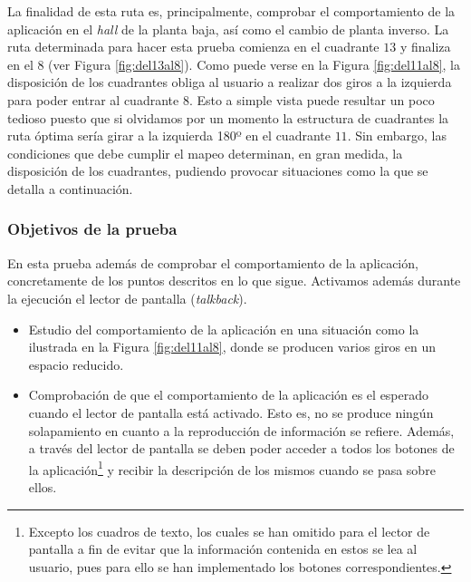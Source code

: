 La finalidad de esta ruta es, principalmente, comprobar el comportamiento de la aplicación en el \textit{hall} de la planta baja, así como el cambio de planta inverso. La ruta determinada para hacer esta prueba comienza en el cuadrante $13$ y finaliza en el $8$ (ver Figura \ref{fig:del13al8}). Como puede verse en la Figura \ref{fig:del11al8}, la disposición de los cuadrantes obliga al usuario a realizar dos giros a la izquierda para poder entrar al cuadrante $8$. Esto a simple vista puede resultar un poco tedioso puesto que si olvidamos por un momento la estructura de cuadrantes la ruta óptima sería girar a la izquierda 180º en el cuadrante $11$. Sin embargo, las condiciones que debe cumplir el mapeo determinan, en gran medida, la disposición de los cuadrantes, pudiendo provocar situaciones como la que se detalla a continuación.

\subsubsection*{Objetivos de la prueba}

En esta prueba además de comprobar el comportamiento de la aplicación, concretamente de los puntos descritos en lo que sigue. Activamos además durante la ejecución el lector de pantalla (\textit{talkback}). 

\begin{itemize}
	\item Estudio del comportamiento de la aplicación en una situación como la ilustrada en la Figura \ref{fig:del11al8}, donde se producen varios giros en un espacio reducido. 
	
	\item Comprobación de que el comportamiento de la aplicación es el esperado cuando el lector de pantalla está activado. Esto es, no se produce ningún solapamiento en cuanto a la reproducción de información se refiere. Además, a través del lector de pantalla se deben poder acceder a todos los botones de la aplicación\footnote{Excepto los cuadros de texto, los cuales se han omitido para el lector de pantalla a fin de evitar que la información contenida en estos se lea al usuario, pues para ello se han implementado los botones correspondientes.} y recibir la descripción de los mismos cuando se pasa sobre ellos. 
\end{itemize}


